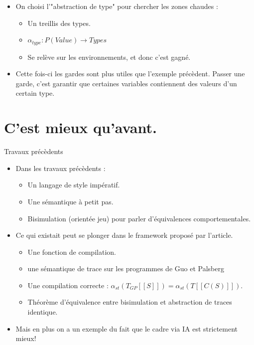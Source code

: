 \documentclass{beamer}
\newcommand\smt[1]{[\![#1]\!]}
\begin{document}
\begin{frame}
\begin{itemize}
\item On choisi l'"abstraction de type" pour chercher les zones chaudes :
\begin{itemize}
\item Un treillis des types.
\item $\alpha_{type} : P(Value) \rightarrow Types$
\item Se relève sur les environnements, et donc c'est gagné.
\end{itemize} 
\item Cette fois-ci les gardes sont plus utiles que l'exemple précèdent. Passer
une garde, c'est garantir que certaines variables contiennent des valeurs d'un
certain type. 
\end{itemize}
\end{frame}


\section{C'est mieux qu'avant.}

\begin{frame}{Travaux précèdents}
\begin{itemize}
\item Dans les travaux précèdents :
\begin{itemize}
\item Un langage de style impératif.
\item Une sémantique à petit pas.
\item Bisimulation (orientée jeu) pour parler d'équivalences comportementales.
\end{itemize}
\pause
\item Ce qui existait peut se plonger dans le framework proposé par l'article.
\begin{itemize}
\item Une fonction de compilation.
\item une sémantique de trace sur les programmes de Guo et Palsberg
\item Une compilation correcte : $\alpha_{st}(T_{GP}\smt{S} ) =
\alpha_{st}(T\smt{C(S)})$.
\item Théorème d'équivalence entre  bisimulation et abstraction de traces identique.  
\end{itemize}
\pause
\item Mais en plus on a un exemple du fait que le cadre via IA est strictement
mieux!
\end{itemize}
\end{frame}
\end{document}
